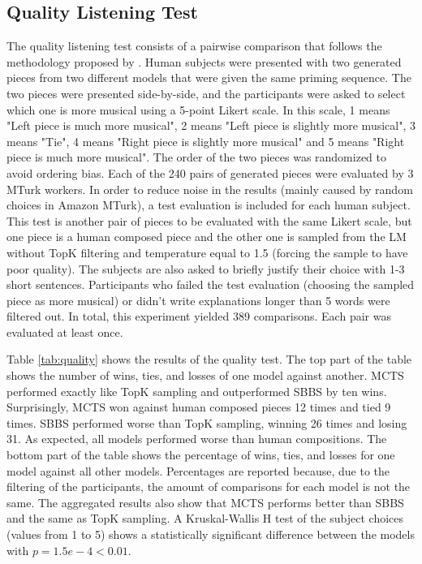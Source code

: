 
\subsection{Quality Listening Test}

The quality listening test consists of a pairwise comparison that follows the methodology proposed by \citet{huang2018music}. Human subjects were presented with two generated pieces from two different models that were given the same priming sequence. The two pieces were presented side-by-side, and the participants were asked to select which one is more musical using a 5-point Likert scale. In this scale, 1 means "Left piece is much more musical", 2 means "Left piece is slightly more musical", 3 means "Tie", 4 means "Right piece is slightly more musical" and 5 means "Right piece is much more musical". The order of the two pieces was randomized to avoid ordering bias. Each of the 240 pairs of generated pieces were evaluated by 3 MTurk workers. In order to reduce noise in the results (mainly caused by random choices in Amazon MTurk), a test evaluation is included for each human subject. This test is another pair of pieces to be evaluated with the same Likert scale, but one piece is a human composed piece and the other one is sampled from the LM without TopK filtering and temperature equal to 1.5 (forcing the sample to have poor quality). The subjects are also asked to briefly justify their choice with 1-3 short sentences. Participants who failed the test evaluation (choosing the sampled piece as more musical) or didn't write explanations longer than 5 words were filtered out. In total, this experiment yielded 389 comparisons. Each pair was evaluated at least once.

Table \ref{tab:quality} shows the results of the quality test. The top part of the table shows the number of wins, ties, and losses of one model against another.  MCTS performed exactly like TopK sampling and outperformed SBBS by ten wins. Surprisingly, MCTS won against human composed pieces 12 times and tied 9 times. SBBS performed worse than TopK sampling, winning 26 times and losing 31. As expected, all models performed worse than human compositions. The bottom part of the table shows the percentage of wins, ties, and losses for one model against all other models. Percentages are reported because, due to the filtering of the participants, the amount of comparisons for each model is not the same. The aggregated results also show that MCTS performs better than SBBS and the same as TopK sampling. A Kruskal-Wallis H test of the subject choices (values from 1 to 5) shows a statistically significant difference between the models with $p = 1.5e-4 < 0.01$.

